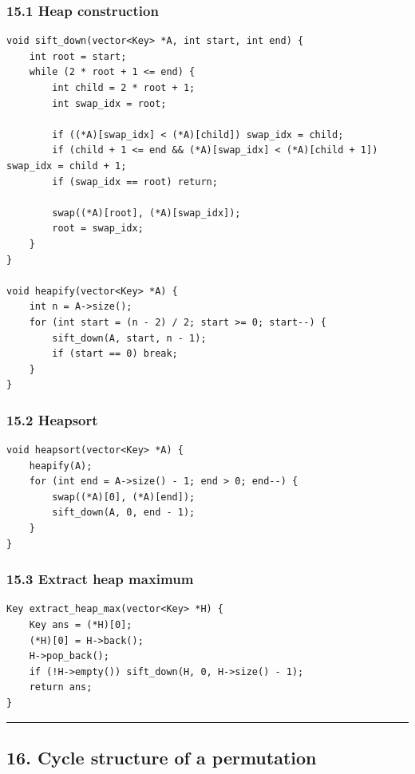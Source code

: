\documentclass[11pt]{article}
\begin{document}
\subsubsection{15.1 Heap construction}\label{heap-construction}

\begin{verbatim}
void sift_down(vector<Key> *A, int start, int end) {
    int root = start;
    while (2 * root + 1 <= end) {
        int child = 2 * root + 1;
        int swap_idx = root;

        if ((*A)[swap_idx] < (*A)[child]) swap_idx = child;
        if (child + 1 <= end && (*A)[swap_idx] < (*A)[child + 1]) swap_idx = child + 1;
        if (swap_idx == root) return;

        swap((*A)[root], (*A)[swap_idx]);
        root = swap_idx;
    }
}

void heapify(vector<Key> *A) {
    int n = A->size();
    for (int start = (n - 2) / 2; start >= 0; start--) {
        sift_down(A, start, n - 1);
        if (start == 0) break;
    }
}
\end{verbatim}

\subsubsection{15.2 Heapsort}\label{heapsort}

\begin{verbatim}
void heapsort(vector<Key> *A) {
    heapify(A);
    for (int end = A->size() - 1; end > 0; end--) {
        swap((*A)[0], (*A)[end]);
        sift_down(A, 0, end - 1);
    }
}
\end{verbatim}

\subsubsection{15.3 Extract heap maximum}\label{extract-heap-maximum}

\begin{verbatim}
Key extract_heap_max(vector<Key> *H) {
    Key ans = (*H)[0];
    (*H)[0] = H->back();
    H->pop_back();
    if (!H->empty()) sift_down(H, 0, H->size() - 1);
    return ans;
}
\end{verbatim}

\begin{center}\rule{0.5\linewidth}{0.5pt}\end{center}

\subsection{16. Cycle structure of a permutation}\label{cycle-structure-of-a-permutation}
\end{document}
